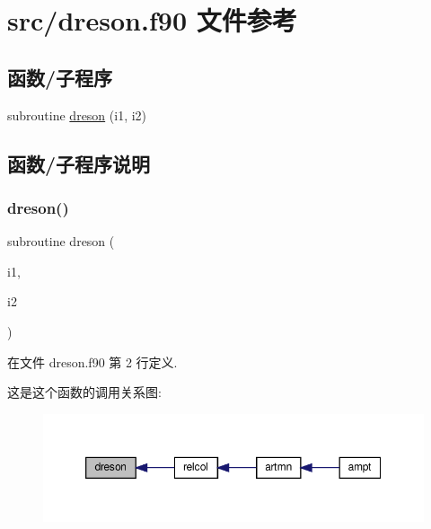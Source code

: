 \hypertarget{dreson_8f90}{}\section{src/dreson.f90 文件参考}
\label{dreson_8f90}
\subsection*{函数/子程序}
\begin{DoxyCompactItemize}
\item 
subroutine \mbox{\hyperlink{dreson_8f90_a4515a3b666f050e1d4fa265aca917dcb}{dreson}} (i1, i2)
\end{DoxyCompactItemize}


\subsection{函数/子程序说明}
\mbox{\label{dreson_8f90_a4515a3b666f050e1d4fa265aca917dcb}} 
\subsubsection{\texorpdfstring{dreson()}{dreson()}}
{\footnotesize\ttfamily subroutine dreson (\begin{DoxyParamCaption}\item[{}]{i1,  }\item[{}]{i2 }\end{DoxyParamCaption})}



在文件 dreson.\+f90 第 2 行定义.

这是这个函数的调用关系图\+:
\nopagebreak
\begin{figure}[H]
\begin{center}
\leavevmode
\includegraphics[width=350pt]{dreson_8f90_a4515a3b666f050e1d4fa265aca917dcb_icgraph}
\end{center}
\end{figure}
